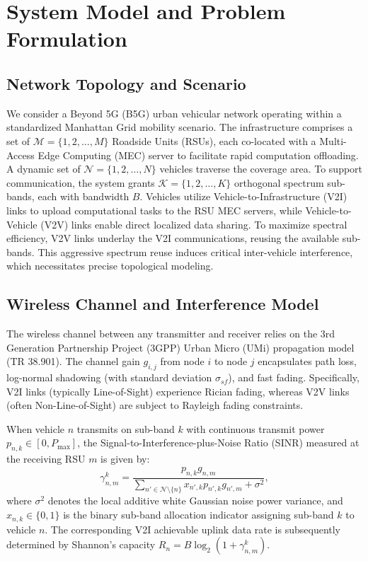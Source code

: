 \section{System Model and Problem Formulation}
\label{sec:model}

\subsection{Network Topology and Scenario}
We consider a Beyond 5G (B5G) urban vehicular network operating within a standardized Manhattan Grid mobility scenario. The infrastructure comprises a set of $\mathcal{M} = \{1, 2, \dots, M\}$ Roadside Units (RSUs), each co-located with a Multi-Access Edge Computing (MEC) server to facilitate rapid computation offloading. A dynamic set of $\mathcal{N} = \{1, 2, \dots, N\}$ vehicles traverse the coverage area. To support communication, the system grants $\mathcal{K} = \{1, 2, \dots, K\}$ orthogonal spectrum sub-bands, each with bandwidth $B$. Vehicles utilize Vehicle-to-Infrastructure (V2I) links to upload computational tasks to the RSU MEC servers, while Vehicle-to-Vehicle (V2V) links enable direct localized data sharing. To maximize spectral efficiency, V2V links underlay the V2I communications, reusing the available sub-bands. This aggressive spectrum reuse induces critical inter-vehicle interference, which necessitates precise topological modeling.

\subsection{Wireless Channel and Interference Model}
The wireless channel between any transmitter and receiver relies on the 3rd Generation Partnership Project (3GPP) Urban Micro (UMi) propagation model (TR 38.901). The channel gain $g_{i,j}$ from node $i$ to node $j$ encapsulates path loss, log-normal shadowing (with standard deviation $\sigma_{sf}$), and fast fading. Specifically, V2I links (typically Line-of-Sight) experience Rician fading, whereas V2V links (often Non-Line-of-Sight) are subject to Rayleigh fading constraints. 

When vehicle $n$ transmits on sub-band $k$ with continuous transmit power $p_{n,k} \in [0, P_{\max}]$, the Signal-to-Interference-plus-Noise Ratio (SINR) measured at the receiving RSU $m$ is given by:
\begin{equation}
    \gamma_{n,m}^k = \frac{p_{n,k} g_{n,m}}{\sum_{n' \in \mathcal{N} \setminus \{n\}} x_{n',k} p_{n',k} g_{n',m} + \sigma^2},
\end{equation}
where $\sigma^2$ denotes the local additive white Gaussian noise power variance, and $x_{n,k} \in \{0, 1\}$ is the binary sub-band allocation indicator assigning sub-band $k$ to vehicle $n$. The corresponding V2I achievable uplink data rate is subsequently determined by Shannon's capacity $R_n = B \log_2(1 + \gamma_{n,m}^k)$. 

